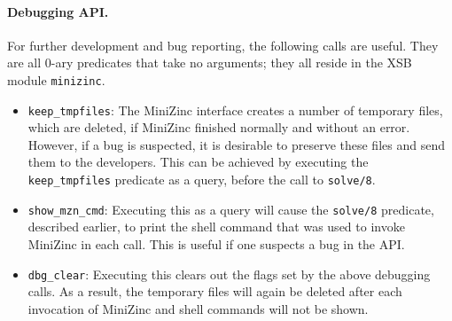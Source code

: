 \paragraph{Debugging API.}
For further development and bug reporting, the following calls are useful.
They are all 0-ary predicates that take no arguments; they all reside in the
XSB module \texttt{minizinc}. 
\begin{itemize}
\item  \texttt{keep\_tmpfiles}: The MiniZinc interface creates a number of
  temporary files, which are deleted, if MiniZinc finished normally and
  without an error. However, if a bug is suspected, it is desirable to
  preserve these files and send them to the developers. 
  This can be achieved by executing the \texttt{keep\_tmpfiles} predicate
  as a query, before the call to \texttt{solve/8}.
\item \texttt{show\_mzn\_cmd}: Executing this as a query will cause the
  \texttt{solve/8} predicate, described earlier, to print the shell command
  that was used to invoke MiniZinc in each call.
  This is useful if one suspects a bug in the API.
\item \texttt{dbg\_clear}: Executing this clears out the flags set by the
  above debugging calls. As a result, the temporary files will again be
  deleted after each invocation of MiniZinc and shell commands will not be
  shown.
\end{itemize}



